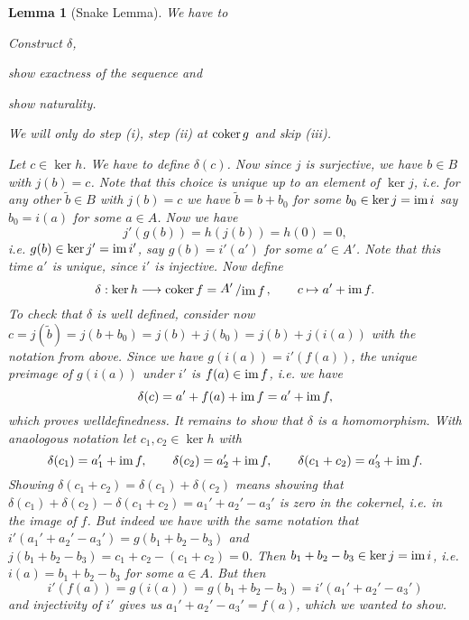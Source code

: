 \documentclass[11pt]{book}
\numberwithin{dummy}{section}
\newtheorem{lemma}[theorem]{Lemma}
\theoremstyle{nonumberbreak}
\newenvironment{pr}[1][]{\ifthenelse{\equal{#1}{}}{\proof}{\proof[#1]}\rm}{\endproof}
\newcommand{\im}{\mathrm{im} \hspace{1.5pt}}
\newcommand{\cokern}{\mathrm{coker}\hspace{1.5pt}}
\newcommand{\la}{\longrightarrow}
\newcommand{\slant}[2]{{\raisebox{.1em}{$#1$}\left/\raisebox{-.1em}{$#2$}\right.}}
\begin{document}
\begin{spacing}{1.4}
\begin{lemma}[Snake Lemma]
\begin{pr}
We have to 
\begin{compactenum}
\item Construct $\delta$,
\item show exactness of the sequence and
\item show naturality.
\end{compactenum}
We will only do step (i), step (ii) at $\cokern g$ and skip (iii).
\begin{compactenum}
\item Let $c \in \ker h$. We have to define $\delta(c)$. Now since $j$ is surjective, we have $b \in B$ with $j(b) =c$. Note that this choice is unique up to an element of $\ker j$, i.e. for any other $\tilde{b} \in B$ with $j(b)=c$ we have $\tilde{b} = b + b_0$ for some $b_0 \in \ker j = \im i$ say $b_0=i(a)$ for some $a \in A$. Now we have 
$$j'(g(b))= h(j(b)) = h(0) = 0,$$
i.e. $g(b) \in \ker j' = \im i'$, say $g(b) = i'(a')$ for some $a' \in A'$. Note that this time $a'$ is unique, since $i'$ is injective. Now define
$$\delta: \ker h \la \cokern f = \slant{A'}{\im f}, \qquad c \mapsto a'+ \im f.$$
To check that $\delta$ is well defined, consider now $c=j(\tilde{b})=j(b+b_0) = j(b) + j(b_0)= j(b) + j(i(a))$ with the notation from above. Since we have $g(i(a))=i'(f(a))$, the unique preimage of $g(i(a))$ under $i'$ is $f(a) \in \im f$, i.e. we have
$$\delta(c) = a' + f(a) + \im f = a' + \im f,$$
which proves welldefinedness. It remains to show that $\delta$ is a homomorphism. With anaologous notation let $c_1, c_2 \in \ker h$ with 
$$\delta(c_1) = a_1' + \im f, \qquad \delta(c_2) = a_2' + \im f, \qquad \delta(c_1+c_2) = a_3' + \im f.$$
Showing $\delta(c_1+c_2) = \delta(c_1) + \delta(c_2)$ means showing that $\delta(c_1) + \delta(c_2) - \delta(c_1+c_2) = a_1'+a_2'-a_3'$ is zero in the cokernel, i.e. in the image of $f$. But indeed we have with the same notation that $i'(a_1'+a_2'-a_3') = g(b_1+b_2-b_3)$ and $j(b_1+b_2-b_3) = c_1+c_2-(c_1+c_2) = 0$. Then $b_1+b_2-b_3 \in \ker j = \im i$, i.e. $i(a) = b_1+b_2-b_3$ for some $a \in A$. But then 
$$i'(f(a)) = g(i(a)) = g(b_1+b_2-b_3) = i'(a_1'+a_2'-a_3')$$
and injectivity of $i'$ gives us $a_1'+a_2'-a_3' = f(a)$, which we wanted to show.


\end{compactenum}
\end{pr}
\end{lemma}
\end{spacing}
\end{document}
